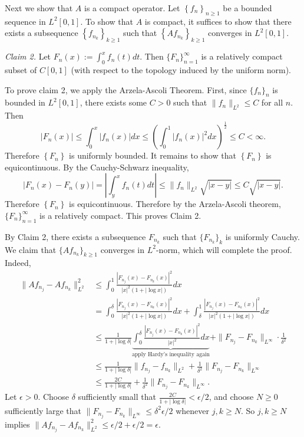\documentclass[answers]{exam}
\def\({\left (}
\def\){\right )}
\begin{document}
\begin{questions}
\begin{solution}
  Next we show that $A$ is a compact operator. Let $\left\{ f_{n} \right\}_{n\geq 1}$ be a bounded sequence in $L^{2}[0,1]$. To show that $A$ is compact, it suffices to show that there exists a subsequence $\left\{ f_{n_{k}} \right\}_{k\geq 1}$ such that $\left\{ Af_{n_{k}} \right\}_{k\geq 1}$ converges in $L^{2}[0,1]$.

  
  \textit{Claim 2.} Let $F_{n}(x):=\int_{0}^{x}f_{n}(t)dt$. Then $\{F_{n}\}_{n=1}^{\infty}$ is a relatively compact subset of $C[0,1]$ (with respect to the topology induced by the uniform norm).

  To prove claim 2, we apply the Arzela-Ascoli Theorem. First, since $\{f_{n}\}_{n}$ is bounded in $L^{2}[0,1]$, there exists some $C>0$ such that $\| f_{n} \|_{L^{2}}\leq C$ for all $n$. Then
  \begin{equation*}
    |F_{n}(x)| \leq \int_{0}^{x}|f_{n}(x)|dx \leq \(\int_{0}^{1}|f_{n}(x)|^{2}dx \)^{\frac{1}{2}} \leq C <\infty.
  \end{equation*}
  Therefore $\left\{ F_{n} \right\}$ is uniformly bounded. It remains to show that $\left\{ F_{n} \right\}$ is equicontinuous. By the Cauchy-Schwarz inequality,
  \begin{equation*}
    \left| F_{n}(x)-F_{n}(y) \right| = \left| \int_{y}^{x}f_{n}(t)dt \right| \leq \| f_{n} \|_{L^{2}} \sqrt{|x-y|} \leq C \sqrt{|x-y|}.
  \end{equation*}
  Therefore  $\left\{ F_{n} \right\}$ is equicontinuous. Therefore by the Arzela-Ascoli theorem, $\{F_{n}\}_{n=1}^{\infty}$ is a relatively compact. This proves Claim 2.

  By Claim 2, there exists a subsequence $F_{n_{k}}$ such that $\{F_{n_{k}}\}_{k}$ is uniformly Cauchy. We claim that $\{Af_{n_{k}}\}_{k\geq 1}$ converges in $L^{2}$-norm, which will complete the proof. Indeed,
  \begin{align*}
    \| Af_{n_{j}}-Af_{n_{k}} \|_{L^{2}}^{2}
    &\leq \int_{0}^{1}\frac{|F_{n_{j}}(x)-F_{n_{k}}(x)|^{2}}{|x|^{2}\left( 1+|\log x| \right)} dx\\
    &= \int_{0}^{\delta}\frac{|F_{n_{j}}(x)-F_{n_{k}}(x)|^{2}}{|x|^{2}\left( 1+|\log x| \right)} dx + \int_{\delta}^{1}\frac{|F_{n_{j}}(x)-F_{n_{k}}(x)|^{2}}{|x|^{2}\left( 1+|\log x| \right)} dx\\
    &\leq \frac{1}{1+|\log \delta |} \underbrace{\int_{0}^{\delta}\frac{|F_{n_{j}}(x)-F_{n_{k}}(x)|^{2}}{|x|^{2}} dx}_{\text{apply Hardy's inequality again}} + \| F_{n_{j}}-F_{n_{k}} \|_{L^{\infty}} \cdot\frac{1}{\delta^{2}}\\
    &\leq \frac{1}{1+|\log \delta |} \| f_{n_{j}}-f_{n_{k}} \|_{L^{2}} + \frac{1}{\delta^{2}} \| F_{n_{j}}-F_{n_{k}}\|_{L^{\infty}}\\
    &\leq \frac{2C}{1+|\log \delta|} + \frac{1}{\delta^{2}} \| F_{n_{j}}-F_{n_{k}} \|_{L^{\infty}}.
  \end{align*}
  Let $\epsilon>0$. Choose $\delta$ sufficiently small that $\frac{2C}{1+|\log \delta|}<\epsilon/2$, and choose $N\geq 0$ sufficiently large that $\| F_{n_{j}}-F_{n_{k}} \|_{L^{\infty}}\leq \delta^{2}\epsilon/2$ whenever $j,k\geq N$. So $j,k\geq N$ implies $\| Af_{n_{j}}-Af_{n_{k}} \|_{L^{2}}^{2} \leq \epsilon/2 + \epsilon/2= \epsilon$.
  

\end{solution}
\end{questions}
\end{document}
